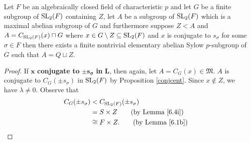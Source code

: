 \begin{theorem}
\label{MaximalAbelianSubgroup.A_eq_Q_join_Z_of_IsConj_s_or_neg_s}
\leanok
Let $F$ be an algebraically closed field of characteristic $p$ and let $G$ be a finite subgroup of $\operatorname{SL}_2(F)$ containing $Z$, let $A$ be a subgroup of $\operatorname{SL}_2(F)$ which is a maximal abelian subgroup of $G$ and furthermore suppose $Z < A$ and $A = C_{\operatorname{SL}_2(F)}(x) \sqcap G$ where $x \in G \setminus Z \subseteq \operatorname{SL}_2(F)$ and $x$ is conjugate to $s_\sigma$ for some $\sigma \in F$
then there exists a finite nontrivial elementary abelian Sylow $p$-subgroup of $G$ such that $A = Q \sqcup Z$.
\end{theorem}
\begin{proof}
  \leanok
  If $\pmb{x}$ \textbf{conjugate to} $\pmb{\pm s_\sigma}$ \textbf{in} $\pmb{L}$, then again, let $A = C_G(x) \in \mathfrak{M}$. $A$ is conjugate to $C_G({\pm s_\sigma})$ in $\operatorname{SL}_2(F)$ by Proposition \ref{conjcent}. Since $x \notin Z$, we have $\lambda \neq 0$. Observe that
  \begin{align*}  C_G({\pm s_\sigma}) &<  C_{\SL_2(F)}({\pm s_\sigma})
  \\&= S \times Z  \tag{by Lemma \ref{6.4i}}
  \\&\cong F \times Z. \tag{by Lemma \ref{6.1b}}
  \end{align*}
  

\end{proof}
